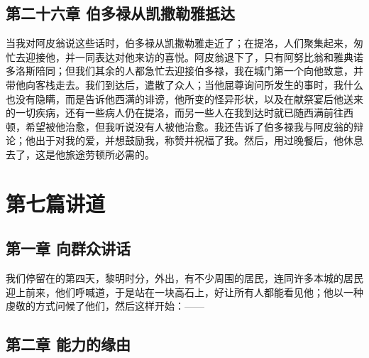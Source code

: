 
\subsection{第二十六章 伯多禄从凯撒勒雅抵达}

当我对阿皮翁说这些话时，伯多禄从凯撒勒雅走近了；在提洛，人们聚集起来，匆忙去迎接他，并一同表达对他来访的喜悦。阿皮翁退下了，只有阿努比翁和雅典诺多洛斯陪同；但我们其余的人都急忙去迎接伯多禄，我在城门第一个向他致意，并带他向客栈走去。我们到达后，遣散了众人；当他屈尊询问所发生的事时，我什么也没有隐瞒，而是告诉他西满的诽谤，他所变的怪异形状，以及在献祭宴后他送来的一切疾病，还有一些病人仍在提洛，而另一些人在我到达时就已随西满前往西顿，希望被他治愈，但我听说没有人被他治愈。我还告诉了伯多禄我与阿皮翁的辩论；他出于对我的爱，并想鼓励我，称赞并祝福了我。然后，用过晚餐后，他休息去了，这是他旅途劳顿所必需的。\par



\section{第七篇讲道}


\subsection{第一章 向群众讲话}

我们停留在的第四天，黎明时分，外出，有不少周围的居民，连同许多本城的居民迎上前来，他们呼喊道，于是站在一块高石上，好让所有人都能看见他；他以一种虔敬的方式问候了他们，然后这样开始：——\par


\subsection{第二章 能力的缘由}

